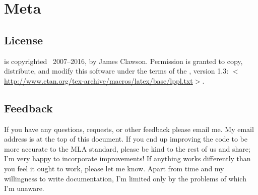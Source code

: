 \documentclass{ltxdockit}[2011/03/25]
\newcommand*{\biblatexmla}{\sty{biblatex-mla}\xspace}
\newcommand*{\mylink}[1]{$<$\url{#1}$>$}
\newcommand*{\mla}{MLA\xspace}
\begin{document}
\section{Meta}
\subsection{License}

\biblatexmla is copyrighted \textcopyright\ 2007--2016, by James Clawson. Permission is granted to copy, distribute, and modify this software under the terms of the \lppl, version 1.3: \mylink{http://www.ctan.org/tex-archive/macros/latex/base/lppl.txt}.

\subsection[Feedback]{Feedback}
\label{int:feb}

If you have any questions, requests, or other feedback please email me. My email address is at the top of this document. If you end up improving the code to be more accurate to the \mla{} standard, please be kind to the rest of us and share; I'm very happy to incorporate improvements! If anything works differently than you feel it ought to work, please let me know. Apart from time and my willingness to write documentation, I'm limited only by the problems of which I'm unaware.
\end{document}

